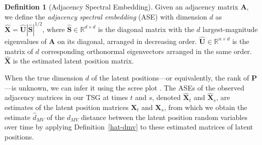 \documentclass[12pt]{article}
\newtheorem{lemma}{Lemma}
\theoremstyle{definition}
\newtheorem{definition}{Definition}
\newcommand{\R}{\mathbb{R}}
\newcommand{\bA}{\mathbf{A}}
\newcommand{\bP}{\mathbf{P}}
\newcommand{\bS}{\mathbf{S}}
\newcommand{\bU}{\mathbf{U}}
\newcommand{\bX}{\mathbf{X}}
\begin{document}
\begin{definition}[Adjacency Spectral Embedding]
Given an adjacency matrix $\bA$, we define the \emph{adjacency spectral embedding} (ASE) with dimension $d$ as $\hat{\bX}=\hat{\bU}|\hat{\bS}|^{1/2}$, where $\hat{\bS}\in\R^{d\times d}$ is the diagonal matrix with the $d$ largest-magnitude eigenvalues of $\bA$ on its diagonal, arranged in decreasing order. $\hat{\bU}\in\R^{n\times d}$ is the matrix of $d$ corresponding orthonormal eigenvectors arranged in the same order. $\hat{\bX}$ is the estimated latent position matrix.  
\end{definition}


When the true dimension $d$ of the latent positions---or equivalently, the rank of $\bP$---is unknown, we can infer it using the scree plot \cite{zhu2006automatic}. The ASEs of the observed adjacency matrices in our TSG  at times $t$ and $s$, denoted $\hat{\bX}_t$ and $\hat{\bX}_s$, are estimates of the latent position matrices $\bX_t$ and $\bX_s$, from which we obtain the estimate $\hat{d}_{MV}$ of the $d_{MV}$ distance between the latent position random variables over time by applying Definition~\ref{hat-dmv} to these estimated matrices of latent positions.

\end{document}
